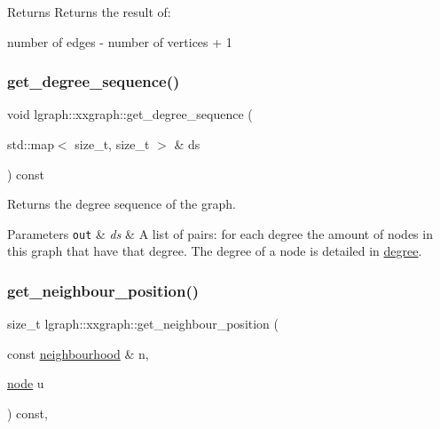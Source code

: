 \begin{DoxyReturn}{Returns}
Returns the result of\+: \begin{DoxyVerb}number of edges - number of vertices + 1
\end{DoxyVerb}
 
\end{DoxyReturn}
\mbox{\label{classlgraph_1_1xxgraph_a5b21b51f5f9c55c05c0e8e5bc836bf87}} 
\subsubsection{\texorpdfstring{get\+\_\+degree\+\_\+sequence()}{get\_degree\_sequence()}}
{\footnotesize\ttfamily void lgraph\+::xxgraph\+::get\+\_\+degree\+\_\+sequence (\begin{DoxyParamCaption}\item[{std\+::map$<$ size\+\_\+t, size\+\_\+t $>$ \&}]{ds }\end{DoxyParamCaption}) const\hspace{0.3cm}{\ttfamily [inherited]}}



Returns the degree sequence of the graph. 


\begin{DoxyParams}[1]{Parameters}
\mbox{\tt out}  & {\em ds} & A list of pairs\+: for each degree the amount of nodes in this graph that have that degree. The degree of a node is detailed in \hyperlink{classlgraph_1_1xxgraph_a20ebc2927ee8fb8bb0a2c3b448d9ed78}{degree}. \\
\hline
\end{DoxyParams}
\mbox{\label{classlgraph_1_1xxgraph_abb0c474cb162940aba3439124c1202d7}} 
\subsubsection{\texorpdfstring{get\+\_\+neighbour\+\_\+position()}{get\_neighbour\_position()}}
{\footnotesize\ttfamily size\+\_\+t lgraph\+::xxgraph\+::get\+\_\+neighbour\+\_\+position (\begin{DoxyParamCaption}\item[{const \hyperlink{namespacelgraph_a052e7766c13f3a43cec0aec8173fdede}{neighbourhood} \&}]{n,  }\item[{\hyperlink{namespacelgraph_a397169dd66adf725210a30fb7251773e}{node}}]{u }\end{DoxyParamCaption}) const\hspace{0.3cm}{\ttfamily [protected]}, {\ttfamily [inherited]}}



